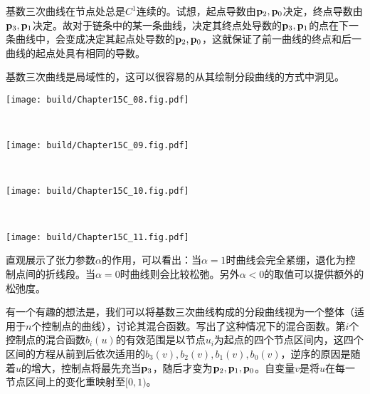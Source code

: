 基数三次曲线在节点处总是$C^1$连续的。试想，起点导数由$\vb{p}_2,\vb{p}_0$决定，终点导数由$\vb{p}_3,\vb{p}_1$决定。故对于链条中的某一条曲线，决定其终点处导数的$\vb{p}_3,\vb{p}_1$的点在下一条曲线中，会变成决定其起点处导数的$\vb{p}_2,\vb{p}_0$，这就保证了前一曲线的终点和后一曲线的起点处具有相同的导数。

基数三次曲线是局域性的，这可以很容易的从其绘制分段曲线的方式中洞见。

\begin{Figure}[基数三次曲线构成的分段曲线]
    \begin{FigureSub}[$\alpha=1.0$;张力1]
        \texttt{[image: build/Chapter15C\_08.fig.pdf]}
    \end{FigureSub} \\ \vspace{0.25cm}
    \begin{FigureSub}[$\alpha=0.0$;张力0]
        \texttt{[image: build/Chapter15C\_09.fig.pdf]}
    \end{FigureSub} \\ \vspace{0.25cm}
    \begin{FigureSub}[$\alpha=-1.0$;张力-1]
        \texttt{[image: build/Chapter15C\_10.fig.pdf]}
    \end{FigureSub} \\ \vspace{0.25cm}
    \begin{FigureSub}[$\alpha=-2.0$;张力-2]
        \texttt{[image: build/Chapter15C\_11.fig.pdf]}
    \end{FigureSub}
\end{Figure}

直观展示了张力参数$\alpha$的作用，可以看出：当$\alpha=1$时曲线会完全紧绷，退化为控制点间的折线段。当$\alpha=0$时曲线则会比较松弛。另外$\alpha<0$的取值可以提供额外的松弛度。


有一个有趣的想法是，我们可以将基数三次曲线构成的分段曲线视为一个整体（适用于$n$个控制点的曲线），讨论其混合函数。写出了这种情况下的混合函数。第$i$个控制点的混合函数$b_i(u)$的有效范围是以节点$u_i$为起点的四个节点区间内，这四个区间的方程从前到后依次适用的$b_3(v),b_2(v),b_1(v),b_0(v)$，逆序的原因是随着$u$的增大，控制点将最先充当$\vb{p}_3$，随后才变为$\vb{p}_2,\vb{p}_1,\vb{p}_0$。自变量$v$是将$u$在每一节点区间上的变化重映射至$[0,1)$。

